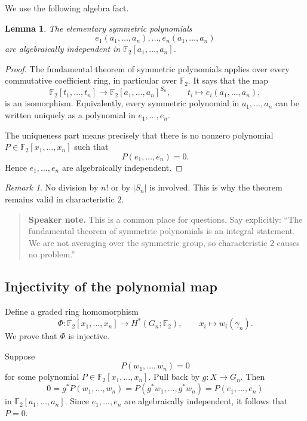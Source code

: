 \documentclass[11pt]{article}
\newtheorem{lemma}[theorem]{Lemma}
\theoremstyle{remark}
\newtheorem{remark}[theorem]{Remark}
\newcommand{\F}{\mathbb F}
\newcommand{\Gn}{G_n}
\newcommand{\gamman}{\gamma_n}
\newenvironment{talknote}{\begin{quote}\small\textbf{Speaker note.} }{\end{quote}}
\begin{document}
We use the following algebra fact.

\begin{lemma}\label{lem:elementary-independent}
The elementary symmetric polynomials
\[
  e_1(a_1,\dots,a_n),\dots,e_n(a_1,\dots,a_n)
\]
are algebraically independent in $\F_2[a_1,\dots,a_n]$.
\end{lemma}

\begin{proof}
The fundamental theorem of symmetric polynomials applies over every commutative coefficient ring, in particular over $\F_2$.  It says that the map
\[
  \F_2[t_1,\dots,t_n]\longrightarrow \F_2[a_1,\dots,a_n]^{S_n},
  \qquad t_i\longmapsto e_i(a_1,\dots,a_n),
\]
is an isomorphism.  Equivalently, every symmetric polynomial in $a_1,\dots,a_n$ can be written uniquely as a polynomial in $e_1,\dots,e_n$.

The uniqueness part means precisely that there is no nonzero polynomial $P\in \F_2[x_1,\dots,x_n]$ such that
\[
  P(e_1,\dots,e_n)=0.
\]
Hence $e_1,\dots,e_n$ are algebraically independent.
\end{proof}

\begin{remark}
No division by $n!$ or by $|S_n|$ is involved.  This is why the theorem remains valid in characteristic $2$.
\end{remark}

\begin{talknote}
This is a common place for questions.  Say explicitly: ``The fundamental theorem of symmetric polynomials is an integral statement.  We are not averaging over the symmetric group, so characteristic $2$ causes no problem.''
\end{talknote}

\subsection{Injectivity of the polynomial map}

Define a graded ring homomorphism
\[
  \Phi:\F_2[x_1,\dots,x_n]\to H^*(\Gn;\F_2),
  \qquad x_i\longmapsto w_i(\gamman).
\]
We prove that $\Phi$ is injective.

Suppose
\[
  P(w_1,\dots,w_n)=0
\]
for some polynomial $P\in\F_2[x_1,\dots,x_n]$.  Pull back by $g:X\to \Gn$.  Then
\[
  0=g^*P(w_1,\dots,w_n)
   =P(g^*w_1,\dots,g^*w_n)
   =P(e_1,\dots,e_n)
\]
in $\F_2[a_1,\dots,a_n]$.  Since $e_1,\dots,e_n$ are algebraically independent, it follows that $P=0$.
\end{document}
